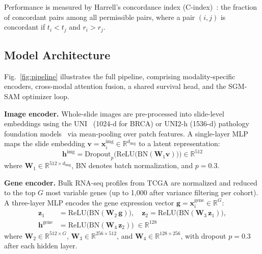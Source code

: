 \documentclass[runningheads]{llncs}
\begin{document}
Performance is measured by Harrell's concordance index
(C-index)~\cite{harrell1996}: the fraction of concordant pairs
among all permissible pairs, where a pair $(i, j)$ is concordant if
$t_i < t_j$ and $r_i > r_j$.

\subsection{Model Architecture}

Fig.~\ref{fig:pipeline} illustrates the full pipeline, comprising
modality-specific encoders, cross-modal attention fusion, a shared
survival head, and the SGM-SAM optimizer loop.

\textbf{Image encoder.}
Whole-slide images are pre-processed into slide-level embeddings using
the UNI~\cite{chen2024uni} (1024-d for BRCA) or UNI2-h (1536-d)
pathology foundation models~\cite{vorontsov2024virchow, lu2024conch}
via mean-pooling over patch features. A single-layer MLP maps the
slide embedding $\mathbf{v} = \mathbf{x}_i^{\text{img}}
\in \mathbb{R}^{d_{\text{img}}}$ to a latent representation:
\begin{equation}
\mathbf{h}^{\text{img}} = \text{Dropout}_{p}\!\bigl(
\text{ReLU}\bigl(\text{BN}(\mathbf{W}_1 \mathbf{v})\bigr)\bigr)
\in \mathbb{R}^{512}
\label{eq:img_enc}
\end{equation}
where $\mathbf{W}_1 \!\in\! \mathbb{R}^{512 \times d_{\text{img}}}$,
BN denotes batch normalization, and $p\!=\!0.3$.

\textbf{Gene encoder.}
Bulk RNA-seq profiles from TCGA are normalized and reduced to the top
$G$ most variable genes (up to 1{,}000 after variance filtering per
cohort). A three-layer MLP encodes the gene
expression vector $\mathbf{g} = \mathbf{x}_i^{\text{gene}}
\in \mathbb{R}^{G}$:
\begin{align}
\mathbf{z}_1 &= \text{ReLU}\bigl(\text{BN}(\mathbf{W}_2\, \mathbf{g})\bigr), \quad
\mathbf{z}_2 = \text{ReLU}\bigl(\text{BN}(\mathbf{W}_3\, \mathbf{z}_1)\bigr), \nonumber \\
\mathbf{h}^{\text{gene}} &= \text{ReLU}\bigl(\text{BN}(\mathbf{W}_4\, \mathbf{z}_2)\bigr)
\;\in \mathbb{R}^{128}
\label{eq:gene_enc}
\end{align}
where $\mathbf{W}_2 \!\in\! \mathbb{R}^{512 \times G}$,
$\mathbf{W}_3 \!\in\! \mathbb{R}^{256 \times 512}$, and
$\mathbf{W}_4 \!\in\! \mathbb{R}^{128 \times 256}$, with dropout
$p\!=\!0.3$ after each hidden layer.
\end{document}
